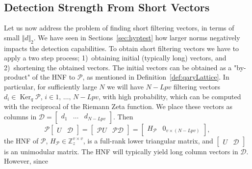 \documentclass[journal, twoside, web]{ieeecolorpreprint}
\DeclareMathOperator{\Ker}{Ker}
\begin{document}

\subsection{Detection Strength From Short Vectors}
\label{sec:vectors}

Let us now address the problem of finding short filtering vectors, in terms of small $\Vert d \Vert_2$. We have seen in Sections~\ref{sec:hyptest} how larger norms negatively impacts the detection capabilities. To obtain short filtering vectors we have to apply a two step process; 1)~obtaining initial (typically long) vectors, and 2)~shortening the obtained vectors. The initial vectors can be obtained as a "by-product" of the HNF to $\mathcal{P}$, as mentioned in Definition~\ref{def:qaryLattice}. In particular, for sufficiently large $N$ we will have $N-Lpv$ filtering vectors  $d_i\in \Ker_q \mathcal{P}$, $i \in {1, \, \dots, \,  N-Lpv}$, with high probability, which can be computed with the reciprocal of the Riemann Zeta function. We place these vectors as columns in $\mathcal{D}= \begin{bmatrix}
         d_1 & \dots &  d_{N-Lpv}
    \end{bmatrix}$. Then 
\begin{equation} \label{eq:HNF}
 \mathcal{P} \begin{bmatrix}
        U & \mathcal{D}
    \end{bmatrix} = \begin{bmatrix}
        \mathcal{P} U & \mathcal{P} \mathcal{D}
    \end{bmatrix} = \begin{bmatrix}
        H_{\mathcal{P}} & 0_{v \times (N-Lpv)}
    \end{bmatrix},
\end{equation}
     the HNF of $\mathcal{P}$, $H_{\mathcal{P}} \in \mathbb{Z}_z^{v \times v}$, is a full-rank lower triangular matrix, and $\begin{bmatrix}
        U & \mathcal{D}
    \end{bmatrix}$ is an unimodular matrix. The HNF will typically yield long column vectors in $\mathcal{D}$. However, since
\end{document}
